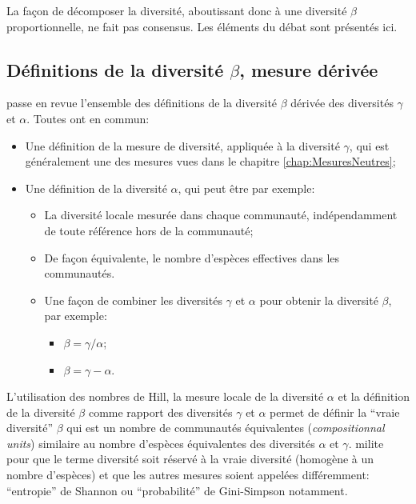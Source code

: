 \documentclass[
  11pt,
  french,
  a4paper,
  extrafontsizes,onecolumn,openright
  ]{memoir}
\providecommand{\tightlist}{%
  \setlength{\itemsep}{0pt}\setlength{\parskip}{0pt}}
\begin{document}
La façon de décomposer la diversité, aboutissant donc à une diversité \(\beta\) proportionnelle, ne fait pas consensus.
Les éléments du débat sont présentés ici.

\hypertarget{duxe9finitions-de-la-diversituxe9-beta-mesure-duxe9rivuxe9e}{%
\subsection{\texorpdfstring{Définitions de la diversité \(\beta\), mesure dérivée}{Définitions de la diversité \textbackslash beta, mesure dérivée}}\label{duxe9finitions-de-la-diversituxe9-beta-mesure-duxe9rivuxe9e}}

\textcite{Tuomisto2010a} passe en revue l'ensemble des définitions de la diversité \(\beta\) dérivée des diversités \(\gamma\) et \(\alpha\).
Toutes ont en commun:

\begin{itemize}
\tightlist
\item
  Une définition de la mesure de diversité, appliquée à la diversité \(\gamma\), qui est généralement une des mesures vues dans le chapitre \ref{chap:MesuresNeutres};
\item
  Une définition de la diversité \(\alpha\), qui peut être par exemple:

  \begin{itemize}
  \tightlist
  \item
    La diversité locale mesurée dans chaque communauté, indépendamment de toute référence hors de la communauté;
  \item
    De façon équivalente, le nombre d'espèces effectives dans les communautés.
  \item
    Une façon de combiner les diversités \(\gamma\) et \(\alpha\) pour obtenir la diversité \(\beta\), par exemple:

    \begin{itemize}
    \tightlist
    \item
      \(\beta={\gamma}/{\alpha}\);
    \item
      \(\beta=\gamma-\alpha\).
    \end{itemize}
  \end{itemize}
\end{itemize}

L'utilisation des nombres de Hill, la mesure locale de la diversité \(\alpha\) et la définition de la diversité \(\beta\) comme rapport des diversités \(\gamma\) et \(\alpha\) permet de définir la ``vraie diversité'' \autocite{Jost2006,Jost2007} \(\beta\) qui est un nombre de communautés équivalentes (\emph{compositionnal units}) similaire au nombre d'espèces équivalentes des diversités \(\alpha\) et \(\gamma\).
\textcite{Tuomisto2011} milite pour que le terme diversité soit réservé à la vraie diversité (homogène à un nombre d'espèces) et que les autres mesures soient appelées différemment: ``entropie'' de Shannon ou ``probabilité'' de Gini-Simpson notamment.
\end{document}
